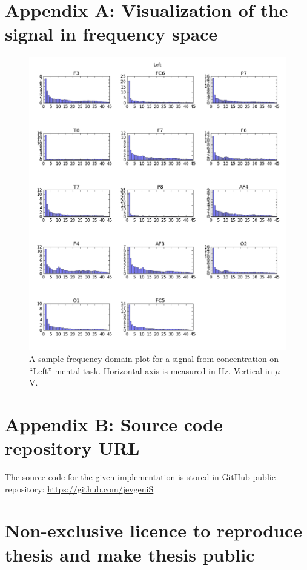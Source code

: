 \documentclass[12pt]{article}
\theoremstyle{definition}
\begin{document}
\section*{Appendix A: Visualization of the signal in frequency space}
\label{app:1}
\begin{figure} [H]
\begin{center}
\includegraphics[width=1\textwidth]{left_amplitudes}
\caption{A sample frequency domain plot for a signal from concentration on ``Left'' mental task. Horizontal axis is measured in Hz. Vertical in $\mu$V.}
\end{center}
\end{figure}

\newpage
\section*{Appendix B: Source code repository URL}
The source code for the given implementation is stored in GitHub public repository:
\url{https://github.com/jevgeniS}

\pagebreak
\section*{\small Non-exclusive licence to reproduce thesis and make thesis public}
\end{document}
